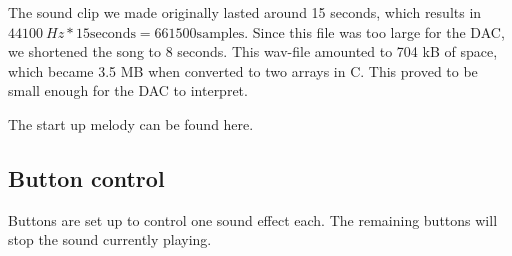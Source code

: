 The sound clip we made originally lasted around 15 seconds, which results in $\SI{44100}{Hz} * 15 \text{seconds} = 661500 \text{samples}$.
Since this file was too large for the DAC, we shortened the song to 8 seconds.
This wav-file amounted to 704 kB of space, which became 3.5 MB when converted to two arrays in C. This proved to be small enough for the DAC to interpret.

The start up melody can be found here. \cite{song}

\subsection{Button control}

Buttons are set up to control one sound effect each. The remaining buttons will stop the sound currently playing.
